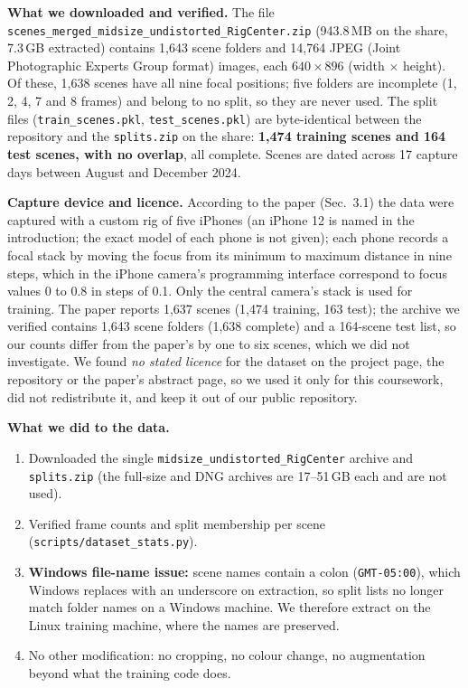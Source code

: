 \documentclass[11pt]{article}
\begin{document}
\textbf{What we downloaded and verified.} The file \texttt{scenes\_merged\_\allowbreak midsize\_undistorted\_\allowbreak RigCenter.zip} (943.8\,MB on the share, 7.3\,GB extracted) contains 1{,}643 scene folders and 14{,}764 JPEG (Joint Photographic Experts Group format) images, each $640\times896$ (width $\times$ height).
Of these, 1{,}638 scenes have all nine focal positions; five folders are incomplete (1, 2, 4, 7 and 8 frames) and belong to no split, so they are never used.
The split files (\texttt{train\_scenes.pkl}, \texttt{test\_scenes.pkl}) are byte-identical between the repository and the \texttt{splits.zip} on the share: \textbf{1{,}474 training scenes and 164 test scenes, with no overlap}, all complete. Scenes are dated across 17 capture days between August and December 2024.

\textbf{Capture device and licence.} According to the paper (Sec.\ 3.1) the data were captured with a custom rig of five iPhones (an iPhone 12 is named in the introduction; the exact model of each phone is not given); each phone records a focal stack by moving the focus from its minimum to maximum distance in nine steps, which in the iPhone camera's programming interface correspond to focus values 0 to 0.8 in steps of 0.1. Only the central camera's stack is used for training.
The paper reports 1{,}637 scenes (1{,}474 training, 163 test); the archive we verified contains 1{,}643 scene folders (1{,}638 complete) and a 164-scene test list, so our counts differ from the paper's by one to six scenes, which we did not investigate.
We found \emph{no stated licence} for the dataset on the project page, the repository or the paper's abstract page, so we used it only for this coursework, did not redistribute it, and keep it out of our public repository.

\textbf{What we did to the data.}
\begin{enumerate}[noitemsep]
  \item Downloaded the single \texttt{midsize\_undistorted\_RigCenter} archive and \texttt{splits.zip} (the full-size and DNG archives are 17--51\,GB each and are not used).
  \item Verified frame counts and split membership per scene (\texttt{scripts/dataset\_stats.py}).
  \item \textbf{Windows file-name issue:} scene names contain a colon (\texttt{GMT-05:00}), which Windows replaces with an underscore on extraction, so split lists no longer match folder names on a Windows machine. We therefore extract on the Linux training machine, where the names are preserved.
  \item No other modification: no cropping, no colour change, no augmentation beyond what the training code does.
\end{enumerate}
\end{document}
